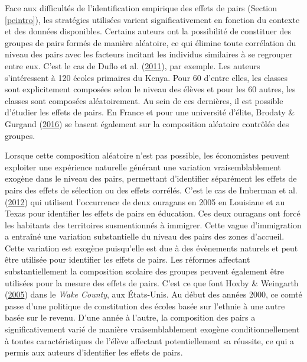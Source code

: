 \documentclass[
]{book}
\begin{document}
\quad Face aux difficultés de l'identification empirique des effets de pairs (Section \ref{peintro}), les stratégies utilisées varient significativement en fonction du contexte et des données disponibles. Certains auteurs ont la possibilité de constituer des groupes de pairs formés de manière aléatoire, ce qui élimine toute corrélation du niveau des pairs avec les facteurs incitant les individus similaires à se regrouper entre eux. C'est le cas de Duflo et al. (\protect\hyperlink{ref-DUF:eal:11}{2011}), par exemple. Les auteurs s'intéressent à 120 écoles primaires du Kenya. Pour 60 d'entre elles, les classes sont explicitement composées selon le niveau des élèves et pour les 60 autres, les classes sont composées aléatoirement. Au sein de ces dernières, il est possible d'étudier les effets de pairs. En France et pour une université d'élite, Brodaty \& Gurgand (\protect\hyperlink{ref-BRO:GUR:16}{2016}) se basent également sur la composition aléatoire contrôlée des groupes.

\quad Lorsque cette composition aléatoire n'est pas possible, les économistes peuvent exploiter une expérience naturelle générant une variation vraisemblablement exogène dans le niveau des pairs, permettant d'identifier séparément les effets de pairs des effets de sélection ou des effets corrélés. C'est le cas de Imberman et al. (\protect\hyperlink{ref-IMB:eal:12}{2012}) qui utilisent l'occurrence de deux ouragans en 2005 en Louisiane et au Texas pour identifier les effets de pairs en éducation. Ces deux ouragans ont forcé les habitants des territoires susmentionnés à immigrer. Cette vague d'immigration a entraîné une variation substantielle du niveau des pairs des zones d'accueil. Cette variation est exogène puisqu'elle est due à des évènements naturels et peut être utilisée pour identifier les effets de pairs. Les réformes affectant substantiellement la composition scolaire des groupes peuvent également être utilisées pour la mesure des effets de pairs. C'est ce que font Hoxby \& Weingarth (\protect\hyperlink{ref-HOX:WEI:05}{2005}) dans le \emph{Wake County}, aux États-Unis. Au début des années 2000, ce comté passe d'une politique de constitution des écoles basée sur l'ethnie à une autre basée sur le revenu. D'une année à l'autre, la composition des pairs a significativement varié de manière vraisemblablement exogène conditionnellement à toutes caractéristiques de l'élève affectant potentiellement sa réussite, ce qui a permis aux auteurs d'identifier les effets de pairs.
\end{document}
